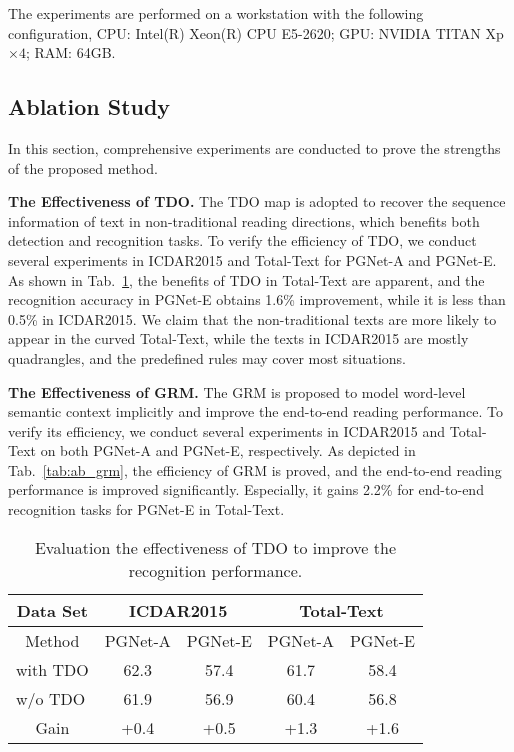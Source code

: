 \documentclass[letterpaper]{article} \usepackage{aaai21}  \usepackage{times}  \usepackage{helvet} \usepackage{courier}  \usepackage[hyphens]{url}  \usepackage{graphicx} \urlstyle{rm} \def\UrlFont{\rm}  \usepackage{natbib}  \usepackage{caption} \usepackage{bm}
\begin{document}
The experiments are performed on a workstation with the following configuration, CPU: Intel(R) Xeon(R) CPU E5-2620; GPU: NVIDIA TITAN Xp $\times 4$; RAM: 64GB. 

\subsection{Ablation Study}
In this section, comprehensive experiments are conducted to prove the strengths of the proposed method.

\textbf{The Effectiveness of TDO.} The TDO map is adopted to recover the sequence information of text in non-traditional reading directions, which benefits both detection and recognition tasks. To verify the efficiency of TDO, we conduct several experiments in ICDAR2015 and Total-Text for PGNet-A and PGNet-E. As shown in Tab.~\ref{tab:ab_tdo}, the benefits of TDO in Total-Text are apparent, and the recognition accuracy in PGNet-E obtains 1.6\% improvement, while it is less than 0.5\% in ICDAR2015. We claim that the non-traditional texts are more likely to appear in the curved Total-Text, while the texts in ICDAR2015 are mostly quadrangles, and the predefined rules may cover most situations.

\textbf{The Effectiveness of GRM.} The GRM is proposed to model word-level semantic context implicitly and improve the end-to-end reading performance. To verify its efficiency, we conduct several experiments in ICDAR2015 and Total-Text on both PGNet-A and PGNet-E, respectively. As depicted in Tab.~\ref{tab:ab_grm}, the efficiency of GRM is proved, and the end-to-end reading performance is improved significantly. Especially, it gains 2.2\% for end-to-end recognition tasks for PGNet-E in Total-Text.

\begin{table}[]
    \centering
    \tabcolsep=4pt\relax
    \begin{tabular}{c|c|c|c|c}
    \hline
    Data Set                            & \multicolumn{2}{c|}{ICDAR2015} & \multicolumn{2}{c}{Total-Text}\\
    \hline
    Method                              & PGNet-A        & PGNet-E       & PGNet-A        & PGNet-E\\
    \hline
    \multicolumn{1}{l|}{with TDO}       & 62.3           & 57.4          & 61.7           & 58.4\\
    \multicolumn{1}{l|}{w/o TDO}        & 61.9           & 56.9          & 60.4           & 56.8\\
    \hline
    Gain                                & +0.4           & +0.5          & +1.3           & +1.6\\
    \hline
    \end{tabular}
    \caption{Evaluation the effectiveness of TDO to improve the recognition performance.}
    \label{tab:ab_tdo}
\end{table} 
\end{document}
